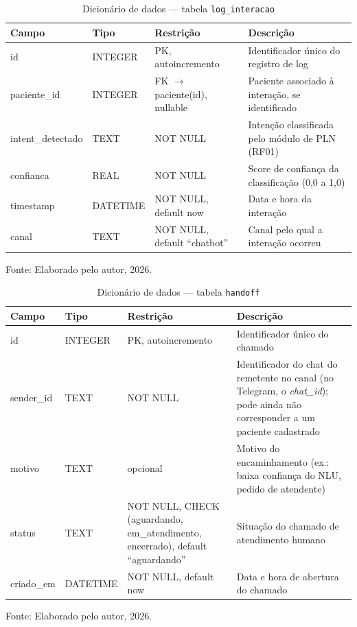 \documentclass[12pt,a4paper]{extarticle}
\begin{document}
\begin{table}[H]
    \centering
    \caption{Dicionário de dados --- tabela \texttt{log\_\allowbreak{}interacao}}
    {\small
    \begin{tabularx}{\textwidth}{@{}L{3.3cm} L{1.8cm} L{4.0cm} Y@{}}
        \toprule
        \textbf{Campo} & \textbf{Tipo} & \textbf{Restrição} & \textbf{Descrição} \\
        \midrule
        id & INTEGER & PK, autoincremento & Identificador único do registro de log \\
        paciente\_\allowbreak{}id & INTEGER & FK $\rightarrow$ paciente(id), nullable & Paciente associado à interação, se identificado \\
        intent\_\allowbreak{}detectado & TEXT & NOT NULL & Intenção classificada pelo módulo de PLN (RF01) \\
        confianca & REAL & NOT NULL & Score de confiança da classificação (0,0 a 1,0) \\
        timestamp & DATETIME & NOT NULL, default now & Data e hora da interação \\
        canal & TEXT & NOT NULL, default ``chatbot'' & Canal pelo qual a interação ocorreu \\
        \bottomrule
    \end{tabularx}
    }
    \vspace{0.12cm}
    {\raggedright\footnotesize Fonte: Elaborado pelo autor, 2026.\par}
\end{table}

\begin{table}[H]
    \centering
    \caption{Dicionário de dados --- tabela \texttt{handoff}}
    {\small
    \begin{tabularx}{\textwidth}{@{}L{3.3cm} L{1.8cm} L{4.0cm} Y@{}}
        \toprule
        \textbf{Campo} & \textbf{Tipo} & \textbf{Restrição} & \textbf{Descrição} \\
        \midrule
        id & INTEGER & PK, autoincremento & Identificador único do chamado \\
        sender\_\allowbreak{}id & TEXT & NOT NULL & Identificador do chat do remetente no canal (no Telegram, o \textit{chat\_id}); pode ainda não corresponder a um paciente cadastrado \\
        motivo & TEXT & opcional & Motivo do encaminhamento (ex.: baixa confiança do NLU, pedido de atendente) \\
        status & TEXT & NOT NULL, CHECK (aguardando, em\_\allowbreak{}atendimento, encerrado), default ``aguardando'' & Situação do chamado de atendimento humano \\
        criado\_\allowbreak{}em & DATETIME & NOT NULL, default now & Data e hora de abertura do chamado \\
        \bottomrule
    \end{tabularx}
    }
    \vspace{0.12cm}
    {\raggedright\footnotesize Fonte: Elaborado pelo autor, 2026.\par}
\end{table}
\end{document}
